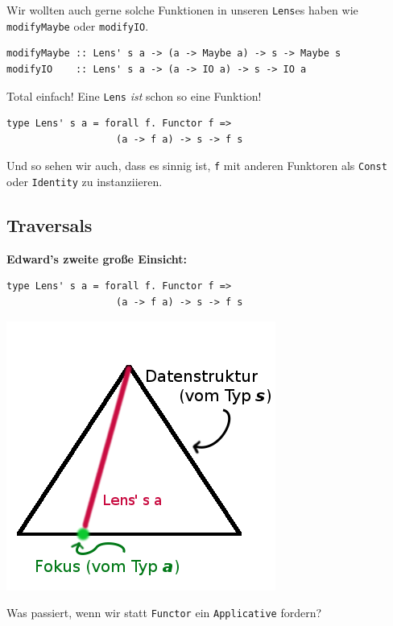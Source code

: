 \documentclass{beamer}
\begin{document}
\begin{frame}[fragile]
Wir wollten auch gerne solche Funktionen in unseren \texttt{Lens}es haben wie \texttt{modifyMaybe} oder \texttt{modifyIO}.

\begin{verbatim}
modifyMaybe :: Lens' s a -> (a -> Maybe a) -> s -> Maybe s
modifyIO    :: Lens' s a -> (a -> IO a) -> s -> IO a
\end{verbatim}
\pause

Total einfach! Eine \texttt{Lens} \emph{ist} schon so eine Funktion!

\begin{verbatim}
type Lens' s a = forall f. Functor f =>
                   (a -> f a) -> s -> f s
\end{verbatim}

Und so sehen wir auch, dass es sinnig ist, \texttt{f} mit anderen Funktoren als \texttt{Const}
oder \texttt{Identity} zu instanziieren.

\end{frame}

\subsection{Traversals}

\begin{frame}[fragile]
\textbf{Edward's zweite große Einsicht:}\pause\bigskip

\begin{verbatim}
type Lens' s a = forall f. Functor f =>
                   (a -> f a) -> s -> f s
\end{verbatim}

\begin{center}
\includegraphics[scale=0.4]{lens_3.png} 
\end{center}
\pause

Was passiert, wenn wir statt \texttt{Functor} ein \texttt{Applicative} fordern?

\end{frame}
\end{document}
